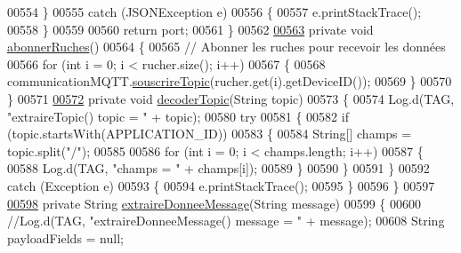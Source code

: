 \begin{DoxyCode}
{{{00554         \}
00555         \textcolor{keywordflow}{catch} (JSONException e)
00556         \{
00557             e.printStackTrace();
00558         \}
00559 
00560         \textcolor{keywordflow}{return} port;
00561     \}
00562 
\hyperlink{classcom_1_1example_1_1bee__honeyt_1_1_i_h_m_mobile_ac255143b5796de6ee0be9852d2b89396}{00563}     \textcolor{keyword}{private} \textcolor{keywordtype}{void} \hyperlink{classcom_1_1example_1_1bee__honeyt_1_1_i_h_m_mobile_ac255143b5796de6ee0be9852d2b89396}{abonnerRuches}()
00564     \{
00565         \textcolor{comment}{// Abonner les ruches pour recevoir les données}
00566         \textcolor{keywordflow}{for} (\textcolor{keywordtype}{int} i = 0; i < rucher.size(); i++)
00567         \{
00568             communicationMQTT.\hyperlink{classcom_1_1example_1_1bee__honeyt_1_1_communication_aa1093a3d4f3479595a36ef2425f3ef70}{souscrireTopic}(rucher.get(i).getDeviceID());
00569         \}
00570     \}
00571 
\hyperlink{classcom_1_1example_1_1bee__honeyt_1_1_i_h_m_mobile_a7bc9099049f98bcc154c1e8d9f773133}{00572}     \textcolor{keyword}{private} \textcolor{keywordtype}{void} \hyperlink{classcom_1_1example_1_1bee__honeyt_1_1_i_h_m_mobile_a7bc9099049f98bcc154c1e8d9f773133}{decoderTopic}(String topic)
00573     \{
00574         Log.d(TAG, \textcolor{stringliteral}{"extraireTopic() topic = "} + topic);
00580         \textcolor{keywordflow}{try}
00581         \{
00582             \textcolor{keywordflow}{if} (topic.startsWith(APPLICATION\_ID))
00583             \{
00584                 String[] champs = topic.split(\textcolor{stringliteral}{"/"});
00585 
00586                 \textcolor{keywordflow}{for} (\textcolor{keywordtype}{int} i = 0; i < champs.length; i++)
00587                 \{
00588                     Log.d(TAG, \textcolor{stringliteral}{"champs = "} + champs[i]);
00589                 \}
00590             \}
00591         \}
00592         \textcolor{keywordflow}{catch} (Exception e)
00593         \{
00594             e.printStackTrace();
00595         \}
00596     \}
00597 
\hyperlink{classcom_1_1example_1_1bee__honeyt_1_1_i_h_m_mobile_a2f781039138b814510102847e70917a1}{00598}     \textcolor{keyword}{private} String \hyperlink{classcom_1_1example_1_1bee__honeyt_1_1_i_h_m_mobile_a2f781039138b814510102847e70917a1}{extraireDonneeMessage}(String message)
00599     \{
00600         \textcolor{comment}{//Log.d(TAG, "extraireDonneeMessage() message = " + message);}
00608 \textcolor{comment}{}        String payloadFields = null;
}}}
\end{DoxyCode}
